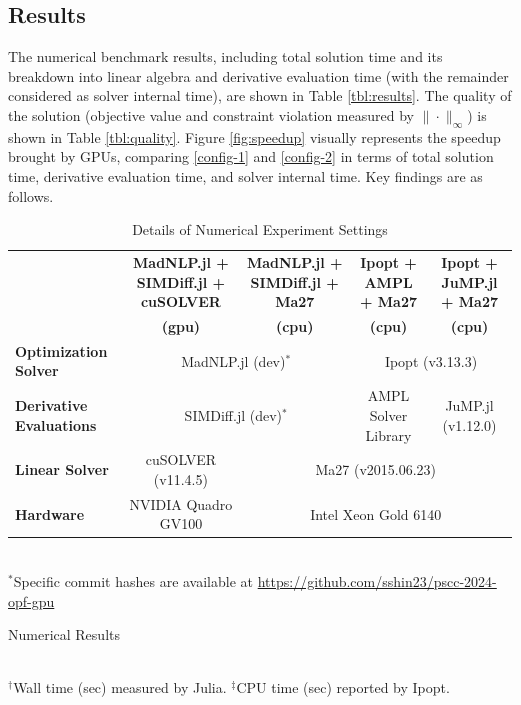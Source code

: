 \subsection{Results}

The numerical benchmark results, including total solution time and its
breakdown into linear algebra and derivative evaluation time (with the
remainder considered as solver internal time), are shown in Table
\ref{tbl:results}. The quality of the solution (objective value and
constraint violation measured by $\|\cdot\|_\infty$) is shown in Table
\ref{tbl:quality}. Figure \ref{fig:speedup} visually represents the
speedup brought by GPUs, comparing \ref{config-1} and \ref{config-2}
in terms of total solution time, derivative evaluation time, and
solver internal time. Key findings are as follows.


\begin{table}[t]
  \scriptsize
  \centering
  \caption{Details of Numerical Experiment Settings}
  \begin{tabular}{|l|c|c|c|c|} 
    \hline
    & {\textbf{MadNLP.jl + SIMDiff.jl + cuSOLVER}} 
    & {\textbf{MadNLP.jl + SIMDiff.jl + Ma27}} 
    & {\textbf{Ipopt + AMPL + Ma27}}
    & {\textbf{Ipopt + JuMP.jl + Ma27}}\\
    &\textbf{(gpu)} &\textbf{(cpu)} &\textbf{(cpu)}& \textbf{(cpu)}\\
    \hline
    \textbf{Optimization Solver} & \multicolumn{2}{c|}{MadNLP.jl (dev)$^*$} & \multicolumn{2}{c|}{Ipopt (v3.13.3)} \\
    \hline
    \textbf{Derivative Evaluations} & \multicolumn{2}{c|}{SIMDiff.jl (dev)$^*$} &  AMPL Solver Library & JuMP.jl (v1.12.0)\\
    \hline
    \textbf{Linear Solver} &  cuSOLVER (v11.4.5) &\multicolumn{3}{c|}{Ma27 (v2015.06.23)}\\
    \hline
    \textbf{Hardware} & NVIDIA Quadro GV100 & \multicolumn{3}{c|}{Intel Xeon Gold 6140}\\ 
    \hline
  \end{tabular}\\
  $^*$Specific commit hashes are available at \url{https://github.com/sshin23/pscc-2024-opf-gpu}
  \label{tbl:settings} 
\end{table}
\begin{table}[t]
  \scriptsize 
  \centering
  \caption{Numerical Results}
  \\
  $^\dag$Wall time (sec) measured by Julia. $^\ddag$CPU time (sec) reported by Ipopt.
  \label{tbl:results}
\end{table}
